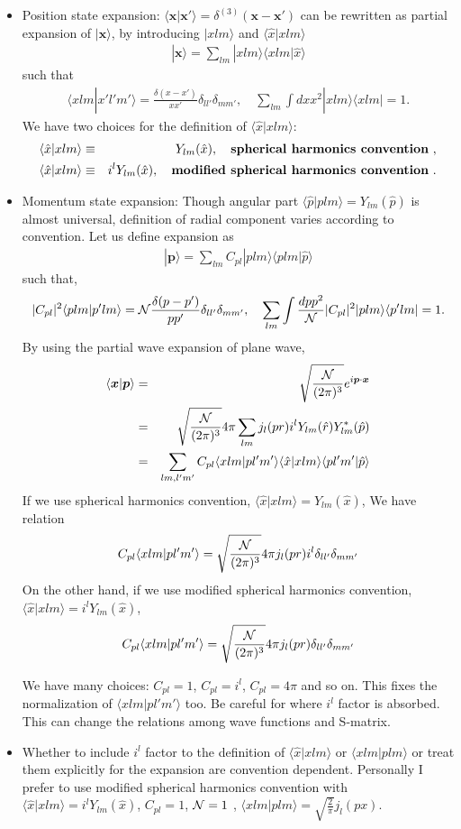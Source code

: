\documentclass[10pt]{book}
\def\bm{\boldsymbol}
\newcommand{\bea}{\begin{eqnarray}}
\newcommand{\eea}{\end{eqnarray}}
\newcommand{\no}{\nonumber \\}
\def\vp{{\bm p}}
\def\vx{{\bm x}}
\def\la{\langle}
\def\ra{\rangle}
\begin{document}
\begin{itemize}
\item Position state expansion: $\la \vx|\vx'\ra=\delta^{(3)}(\vx-\vx')$ can be rewritten as
partial expansion of $|\vx\ra$, by introducing $|xlm\ra$ and $\la \hat{x}|xlm\ra $
\bea
\boxed{ 
|\vx\ra=\sum_{lm}|x lm\ra\la x lm|\hat{x}\ra}
\eea
such that 
\bea
\la x lm|x' l' m'\ra=\frac{\delta(x-x')}{xx'}\delta_{ll'}\delta_{mm'},
\quad
\sum_{lm}\int dx x^2 |x lm\ra\la x lm|=1.
\eea
We have two choices for the definition of $\la \hat{x}|xlm\ra $:
\bea 
\la\hat{x}| x lm\ra&\equiv& Y_{lm}(\hat{x}),\quad 
   \mbox{{\bf spherical harmonics convention} },\no 
\la\hat{x}| x lm\ra&\equiv& i^l Y_{lm}(\hat{x}),\quad
  \mbox{{\bf modified spherical harmonics convention} }.
\eea 

\item Momentum state expansion: Though
 angular part $\la \hat{p}|p lm\ra=Y_{lm}(\hat{p})$ is almost universal,
 definition of radial component varies according to convention. 
 Let us define expansion as 
 \bea 
 \boxed{ 
 |\vp\ra =\sum_{lm} C_{pl} |plm\ra \la plm|\hat{p}\ra  }
 \eea 
 such that,
 \bea 
  |C_{pl}|^2 \la plm|p' lm\ra ={\cal N}\frac{\delta(p-p')}{pp'}\delta_{ll'}\delta_{mm'},\quad 
  \sum_{lm} \int \frac{dp p^2}{{\cal N}}|C_{pl}|^2 |p lm\ra \la p' lm|=1.
 \eea 
 By using the partial wave expansion of plane wave,
 \bea 
 \la \vx|\vp\ra &=&\sqrt{\frac{\cal N}{(2\pi)^{3}}} e^{i\vp\cdot\vx } \no 
                &=&\sqrt{\frac{\cal N}{(2\pi)^{3}}} 4\pi \sum_{lm} j_l(pr) i^l Y_{lm}(\hat{r})Y^*_{lm}(\hat{p}) \no 
                &=&\sum_{lm,l'm'} C_{pl} \la xlm|p l'm'\ra \la \hat{x}|xlm\ra \la pl'm'| \hat{p}\ra 
 \eea 
 If we use spherical harmonics convention, $\la \hat{x}|xlm\ra=Y_{lm}(\hat{x})$,
 We have relation 
 \bea 
 C_{pl} \la xlm|p l'm'\ra=\sqrt{\frac{\cal N}{(2\pi)^{3}}} 4\pi j_{l}(pr) i^l \delta_{ll'}\delta_{mm'}
 \eea 
 On the other hand, if we use modified spherical harmonics convention, 
 $\la \hat{x}|xlm\ra=i^l Y_{lm}(\hat{x})$, 
 \bea 
  C_{pl} \la xlm|p l'm'\ra=\sqrt{\frac{\cal N}{(2\pi)^{3}}} 4\pi j_{l}(pr)\delta_{ll'}\delta_{mm'}
 \eea 
 
  We have many choices: $C_{pl}=1$, $C_{pl}=i^l$, $C_{pl}=4\pi$
  and so on. This fixes the normalization of $\la xlm|p l'm'\ra$ too.
  Be careful for where $i^l$ factor is absorbed. This can change
  the relations among wave functions and S-matrix.
  
\item Whether to include $i^l$ factor to 
the definition of $\la \hat{x}|xlm\ra$ or $\la xlm|plm\ra $ or treat them explicitly
for the expansion are convention dependent. 
Personally I prefer to use modified spherical harmonics convention with 
$\la \hat{x}|xlm\ra =i^l Y_{lm}(\hat{x})$, 
$C_{pl}=1$, 
${\cal N}=1$ , $\la xlm|plm\ra =\sqrt{\frac{2}{\pi} }j_l(px)$.


\end{itemize}
\end{document}
